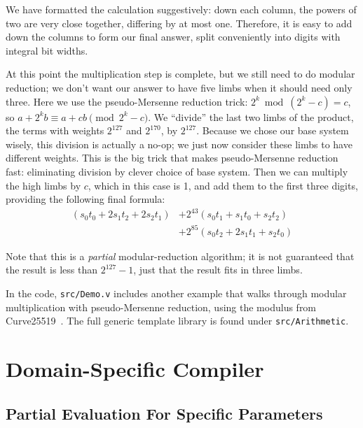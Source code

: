 \documentclass[letterpaper,twocolumn,10pt]{article}
\begin{document}
We have formatted the calculation suggestively: down each column, the powers of two are very close together, differing by at most one.
Therefore, it is easy to add down the columns to form our final answer, split conveniently into digits with integral bit widths.

At this point the multiplication step is complete, but we still need to do modular reduction; we don't want our answer to have five limbs when it should need only three.
Here we use the pseudo-Mersenne reduction trick: $2^k \bmod {(2^k -c)} = c$, so $a + 2^kb \equiv a + cb \pmod{2^k - c}$.
We ``divide'' the last two limbs of the product, the terms with weights $2^{127}$ and $2^{170}$, by $2^{127}$.
Because we chose our base system wisely, this division is actually a no-op; we just now consider these limbs to have different weights.
This is the big trick that makes pseudo-Mersenne reduction fast: eliminating division by clever choice of base system.
Then we can multiply the high limbs by $c$, which in this case is 1, and add them to the first three digits, providing the following final formula:
\begin{align*}
  (s_0t_0 + 2s_1t_2 + 2s_2t_1) &+ 2^{43}(s_0t_1 + s_1t_0 + s_2t_2) \\
  &+ 2^{85}(s_0t_2 + 2s_1t_1 + s_2t_0)
\end{align*}

Note that this is a \emph{partial} modular-reduction algorithm; it is not guaranteed that the result is less than $2^{127}-1$, just that the result fits in three limbs.

In the code, \texttt{src/Demo.v} includes another example that walks through modular multiplication with pseudo-Mersenne reduction, using the modulus from Curve25519~\cite{curve25519}. The full generic template library is found under \texttt{src/Arithmetic}.

\section{Domain-Specific Compiler}\label{compiler}

\subsection{Partial Evaluation For Specific Parameters}\label{partial}
\end{document}
